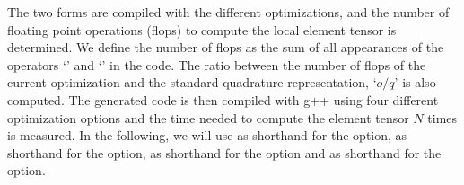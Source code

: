 The two forms are compiled with the different \ffc{} optimizations,
and the number of floating point operations (flops)  to
compute the local element tensor is determined.  We define the number
of flops as the sum of all appearances of the operators `\emp{+}' and
`\emp{*}' in the code.  The ratio between the number of flops of the
current \ffc{} optimization and the standard quadrature representation,
`$o/q$' is also computed.  The generated code is then compiled with
g++ using four different optimization options and the time needed to
compute the element tensor $N$ times is measured.  In the following,
we will use  as shorthand for the
 option,  as shorthand for the
 option,  as shorthand for the
 option and  as shorthand for the
 option.

